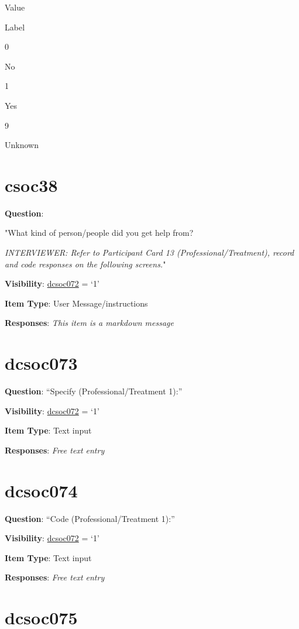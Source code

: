 \documentclass[]{book}
\begin{document}
Value

Label

0

No

1

Yes

9

Unknown

\hypertarget{csoc38}{%
\section{csoc38}\label{csoc38}}

\textbf{Question}:

"What kind of person/people did you get help from?

\emph{INTERVIEWER: Refer to Participant Card 13 (Professional/Treatment), record and code responses on the following screens.}"

\textbf{Visibility}: \protect\hyperlink{dcsoc072}{dcsoc072} = `1'

\textbf{Item Type}: User Message/instructions

\textbf{Responses}: \emph{This item is a markdown message}

\hypertarget{dcsoc073}{%
\section{dcsoc073}\label{dcsoc073}}

\textbf{Question}: ``Specify (Professional/Treatment 1):''

\textbf{Visibility}: \protect\hyperlink{dcsoc072}{dcsoc072} = `1'

\textbf{Item Type}: Text input

\textbf{Responses}: \emph{Free text entry}

\hypertarget{dcsoc074}{%
\section{dcsoc074}\label{dcsoc074}}

\textbf{Question}: ``Code (Professional/Treatment 1):''

\textbf{Visibility}: \protect\hyperlink{dcsoc072}{dcsoc072} = `1'

\textbf{Item Type}: Text input

\textbf{Responses}: \emph{Free text entry}

\hypertarget{dcsoc075}{%
\section{dcsoc075}\label{dcsoc075}}
\end{document}
